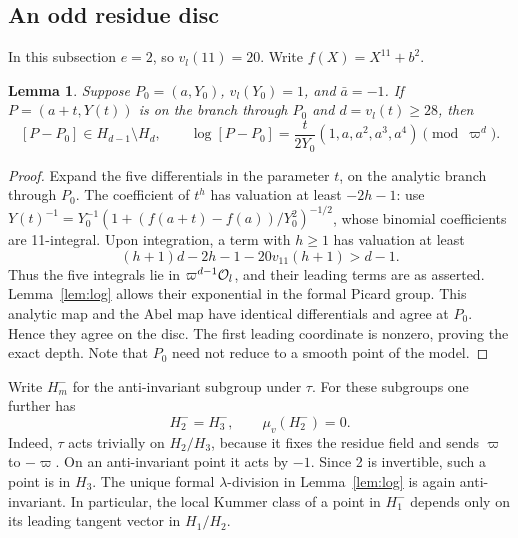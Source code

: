 \documentclass[11pt,reqno]{amsart}
\newtheorem{lemma}[theorem]{Lemma}
\theoremstyle{definition}\newtheorem{definition}[theorem]{Definition}
\theoremstyle{remark}\newtheorem{remark}[theorem]{Remark}
\numberwithin{equation}{section}
\begin{document}
\subsection{An odd residue disc}
In this subsection \(e=2\), so \(v_l(11)=20\).
Write \(f(X)=X^{11}+b^2\).
\begin{lemma}\label{lem:singulardisc}
Suppose \(P_0=(a,Y_0)\), \(v_l(Y_0)=1\), and \(\bar a=-1\).
If \(P=(a+t,Y(t))\) is on the branch through \(P_0\) and
\(d=v_l(t)\ge28\), then
\[
 [P-P_0]\in H_{d-1}\setminus H_d,
 \qquad
 \log[P-P_0]=\frac{t}{2Y_0}(1,a,a^2,a^3,a^4)
                  \pmod{\varpi^d}.
\]
\end{lemma}
\begin{proof}
Expand the five differentials in the parameter \(t\), on the analytic
branch through \(P_0\). The coefficient of \(t^h\) has valuation at
least \(-2h-1\): use
\(Y(t)^{-1}=Y_0^{-1}(1+(f(a+t)-f(a))/Y_0^2)^{-1/2}\), whose binomial
coefficients are 11-integral. Upon integration, a term with \(h\ge1\)
has valuation at least
\[
 (h+1)d-2h-1-20v_{11}(h+1)>d-1.
\]
Thus the five integrals lie in \(\varpi^{d-1}\mathcal O_l\), and their
leading terms are as asserted. Lemma~\ref{lem:log} allows their
exponential in the formal Picard group. This analytic map and the Abel
map have identical differentials and agree at \(P_0\). Hence they
agree on the disc. The first leading coordinate is nonzero, proving the exact
depth. Note that \(P_0\) need not reduce to a smooth point of the model.
\end{proof}

Write \(H_m^-\) for the anti-invariant subgroup under \(\tau\).
For these subgroups one further has
\begin{equation}\label{eq:H2}
 H_2^- = H_3^-,\qquad \mu_v(H_2^-)=0.
\end{equation}
Indeed, \(\tau\) acts trivially on \(H_2/H_3\), because it fixes the
residue field and sends \(\varpi\) to \(-\varpi\). On an
anti-invariant point it acts by \(-1\). Since 2 is invertible, such a
point is in \(H_3\). The unique formal \(\lambda\)-division in
Lemma~\ref{lem:log} is again anti-invariant. In particular, the local
Kummer class of a point in \(H_1^-\) depends only on its leading
tangent vector in \(H_1/H_2\).
\end{document}
